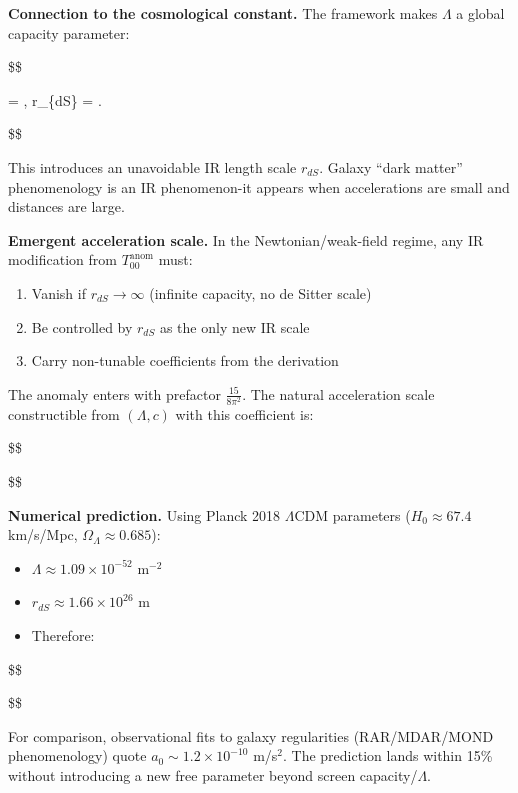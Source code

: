 \documentclass[11pt,a4paper]{article}
\theoremstyle{remark}
\providecommand{\tightlist}{%
  \setlength{\itemsep}{0pt}\setlength{\parskip}{0pt}}
\begin{document}
\textbf{Connection to the cosmological constant.} The framework makes \(\Lambda\) a
global capacity parameter:

\$\$

\Lambda = ,
\quad
r\_\{dS\} = .

\$\$

This introduces an unavoidable IR length scale \(r_{dS}\). Galaxy ``dark matter''
phenomenology is an IR phenomenon-it appears when accelerations are small and
distances are large.

\textbf{Emergent acceleration scale.} In the Newtonian/weak-field regime, any
IR modification from \(T_{00}^{\mathrm{anom}}\) must:

\begin{enumerate}
\def\labelenumi{\arabic{enumi}.}
\tightlist
\item
  Vanish if \(r_{dS} \to \infty\) (infinite capacity, no de Sitter scale)
\item
  Be controlled by \(r_{dS}\) as the only new IR scale
\item
  Carry non-tunable coefficients from the derivation
\end{enumerate}

The anomaly enters with prefactor \(\frac{15}{8\pi^2}\). The natural acceleration
scale constructible from \((\Lambda, c)\) with this coefficient is:

\$\$


\$\$

\textbf{Numerical prediction.} Using Planck 2018 \(\Lambda\)CDM parameters
(\(H_0 \approx 67.4\) km/s/Mpc, \(\Omega_\Lambda \approx 0.685\)):

\begin{itemize}
\tightlist
\item
  \(\Lambda \approx 1.09 \times 10^{-52}\) m\(^{-2}\)
\item
  \(r_{dS} \approx 1.66 \times 10^{26}\) m
\item
  Therefore:
\end{itemize}

\$\$


\$\$

For comparison, observational fits to galaxy regularities (RAR/MDAR/MOND
phenomenology) quote \(a_0 \sim 1.2 \times 10^{-10}\) m/s\(^2\). The prediction
lands within 15\% without introducing a new free parameter beyond screen
capacity/\(\Lambda\).
\end{document}

